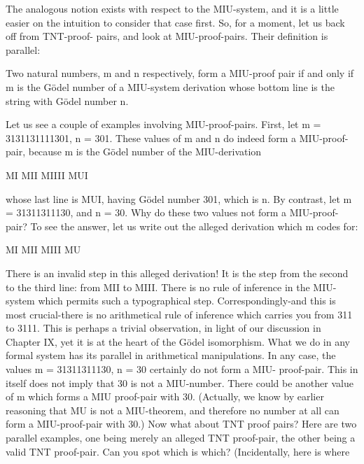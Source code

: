 The analogous notion exists with respect to the MIU-system, and it is a little easier on the
intuition to consider that case first. So, for a moment, let us back off from TNT-proof-
pairs, and look at MIU-proof-pairs. Their definition is parallel:

   Two natural numbers, m and n respectively, form a MIU-proof pair if and only if m
   is the Gödel number of a MIU-system derivation whose bottom line is the string
   with Gödel number n.

Let us see a couple of examples involving MIU-proof-pairs. First, let m =
3131131111301, n = 301. These values of m and n do indeed form a MIU-proof-pair,
because m is the Gödel number of the MIU-derivation

                                       MI
                                      MII
                                     MIIII
                                     MUI

whose last line is MUI, having Gödel number 301, which is n. By contrast, let m =
31311311130, and n = 30. Why do these two values not form a MIU-proof-pair? To see
the answer, let us write out the alleged derivation which m codes for:

                                       MI
                                      MII
                                      MIII
                                      MU

There is an invalid step in this alleged derivation! It is the step from the second to the
third line: from MII to MIII. There is no rule of inference in the MIU-system which
permits such a typographical step. Correspondingly-and this is most crucial-there is no
arithmetical rule of inference which carries you from 311 to 3111. This is perhaps a
trivial observation, in light of our discussion in Chapter IX, yet it is at the heart of the
Gödel isomorphism. What we do in any formal system has its parallel in arithmetical
manipulations.
        In any case, the values m = 31311311130, n = 30 certainly do not form a MIU-
proof-pair. This in itself does not imply that 30 is not a MIU-number. There could be
another value of m which forms a MIU proof-pair with 30. (Actually, we know by earlier
reasoning that MU is not a MIU-theorem, and therefore no number at all can form a
MIU-proof-pair with 30.)
        Now what about TNT proof pairs? Here are two parallel examples, one being
merely an alleged TNT proof-pair, the other being a valid TNT proof-pair. Can you spot
which is which? (Incidentally, here is where




